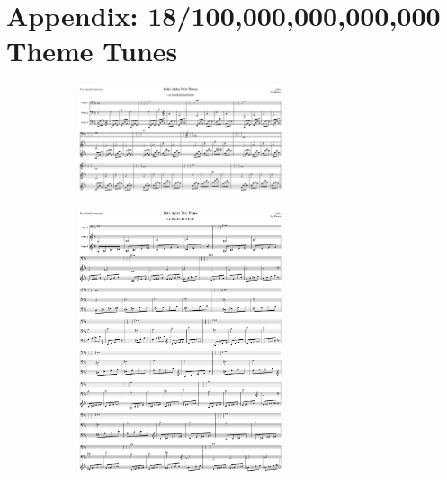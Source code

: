 \chapter{Appendix: 18/100,000,000,000,000 Theme Tunes}


\begin{figure}[H]
{
  \setlength{\tabcolsep}{3.0pt}
  \setlength\cmidrulewidth{\heavyrulewidth} %
    \begin{subfigure}{0.5\textwidth}
  \includegraphics[width=6cm]{music/title_no_1_page_1001.png}%
    \end{subfigure}
  \begin{subfigure}{0.5\textwidth}
  \includegraphics[width=6cm]{music/title_no_2_page_1001.png}%
    \end{subfigure}
}
\end{figure}

\clearpage

